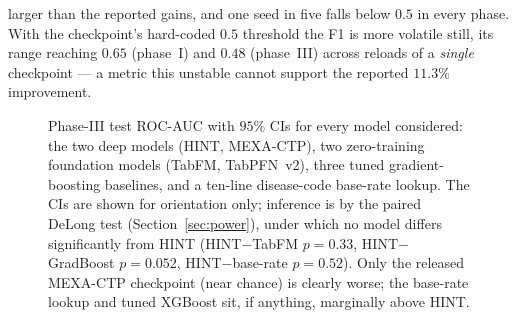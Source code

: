 \documentclass[a4paper,fleqn]{cas-sc}
\begin{document}
larger than the reported gains, and one seed in five falls below $0.5$ in every phase. With
the checkpoint's hard-coded $0.5$ threshold the F1 is more volatile still, its range reaching
$0.65$ (phase~I) and $0.48$ (phase~III) across reloads of a \emph{single} checkpoint --- a
metric this unstable cannot support the reported $11.3\%$ improvement.
\begin{figure}[htbp]
\centering
{}
\caption{Phase-III test ROC-AUC with $95\%$ CIs for every model considered: the two deep
models (HINT, MEXA-CTP), two zero-training foundation models (TabFM, TabPFN~v2), three tuned
gradient-boosting baselines, and a ten-line disease-code base-rate lookup. The CIs are shown for
orientation only; inference is by the paired DeLong test (Section~\ref{sec:power}), under which
no model differs significantly from HINT (HINT$-$TabFM $p=0.33$, HINT$-$GradBoost $p=0.052$,
HINT$-$base-rate $p=0.52$). Only the released MEXA-CTP checkpoint (near chance) is clearly
worse; the base-rate lookup and tuned XGBoost sit, if anything, marginally above HINT.}
\label{fig:forest}
\end{figure}
\end{document}
